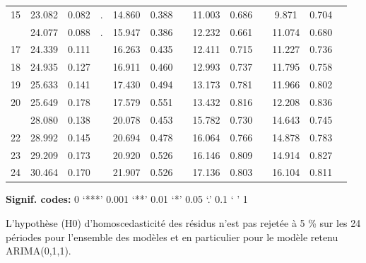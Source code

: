 \documentclass[,french]{article}
\begin{document}
\begin{table}[!h]
{\begin{threeparttable}
\begin{tabular}[t]{ccccccccccccc}
15 & 23.082 & 0.082 & . & 14.860 & 0.388 &  & 11.003 & 0.686 &  & 9.871 & 0.704 & \\
\addlinespace
16 & 24.077 & 0.088 & . & 15.947 & 0.386 &  & 12.232 & 0.661 &  & 11.074 & 0.680 & \\
17 & 24.339 & 0.111 &  & 16.263 & 0.435 &  & 12.411 & 0.715 &  & 11.227 & 0.736 & \\
18 & 24.935 & 0.127 &  & 16.911 & 0.460 &  & 12.993 & 0.737 &  & 11.795 & 0.758 & \\
19 & 25.633 & 0.141 &  & 17.430 & 0.494 &  & 13.173 & 0.781 &  & 11.966 & 0.802 & \\
20 & 25.649 & 0.178 &  & 17.579 & 0.551 &  & 13.432 & 0.816 &  & 12.208 & 0.836 & \\
\addlinespace
21 & 28.080 & 0.138 &  & 20.078 & 0.453 &  & 15.782 & 0.730 &  & 14.643 & 0.745 & \\
22 & 28.992 & 0.145 &  & 20.694 & 0.478 &  & 16.064 & 0.766 &  & 14.878 & 0.783 & \\
23 & 29.209 & 0.173 &  & 20.920 & 0.526 &  & 16.146 & 0.809 &  & 14.914 & 0.827 & \\
24 & 30.464 & 0.170 &  & 21.907 & 0.526 &  & 17.136 & 0.803 &  & 16.104 & 0.811 & \\
\bottomrule
\end{tabular}
\begin{tablenotes}
\item \hspace{-0.4cm}\textbf{Signif. codes: }0 `***' 0.001 `**' 0.01 `*' 0.05 `.' 0.1 ` ' 1
\item L’hypothèse (H0) d’homoscedasticité des résidus n’est pas rejetée à 5 \% sur les 24 périodes pour l’ensemble des modèles et en particulier pour le modèle retenu ARIMA(0,1,1).
\end{tablenotes}
\end{threeparttable}}
\end{table}
\end{document}
